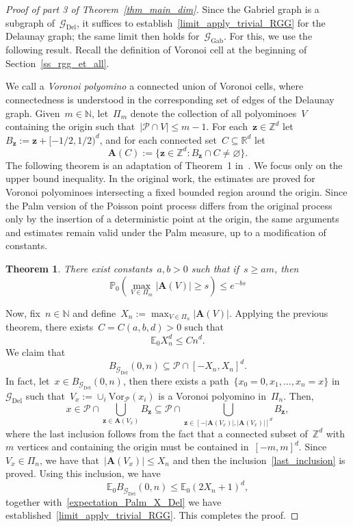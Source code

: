 \documentclass[a4paper,11pt]{article}
\newcommand{\EE}{\mathbb{E}}
\newcommand{\PP}{\mathbb{P}}
\newcommand{\RR}{\mathbb{R}}
\newcommand{\NN}{\mathbb{N}}
\newcommand{\ZZ}{\mathbb{Z}}
\newtheorem{theorem}{Theorem}
\theoremstyle{definition}
\begin{document}
\begin{proof}[Proof of part 3 of Theorem~\ref{thm_main_dim}]
Since the Gabriel graph is a subgraph of~$\mathcal G_\mathrm{Del}$, it suffices to establish~\eqref{limit_apply_trivial_RGG} for the Delaunay graph; the same limit then holds for~$\mathcal G_\mathrm{Gab}$. For this, we use the following result. Recall the definition of Voronoi cell at the beginning of Section~\ref{ss_rgg_et_all}.

We call a \emph{Voronoi polyomino} a connected union of Voronoi cells, where connectedness is understood in the corresponding set of edges of the Delaunay graph. Given~$m \in \NN$, let~$\Pi_m$ denote the collection of all polyominoes~$V$ containing the origin such that~$|\mathcal P \cap V| \leq m-1$. For each~$\mathbf z \in \ZZ^d$ let~$B_\mathbf{z} := \mathbf z + [-1/2,1/2)^d$, and for each connected set~$C \subseteq \RR^d$ let
$$ \mathbf A(C) := \{ \mathbf z \in \ZZ^d : B_\mathbf{z} \cap C \neq \varnothing \}. $$
The following theorem is an adaptation of Theorem~1 in~\cite{Pimentel13}. We focus only on the upper bound inequality. In the original work, the estimates are proved for Voronoi polyominoes intersecting a fixed bounded region around the origin. Since the Palm version of the Poisson point process differs from the original process only by the insertion of a deterministic point at the origin, the same arguments and estimates remain valid under the Palm measure, up to a modification of constants.

\begin{theorem}
There exist constants~$a,b > 0$ such that if~$s \ge a m$, then 
$$ \PP_0 \left( \max_{V \in \Pi_m} |\mathbf A(V)| \ge s \right) \leq e^{-bs} $$
\end{theorem}

Now, fix~$n \in \NN$ and define~$X_n := \max_{V \in \Pi_n} |\mathbf A(V)|$. Applying the previous theorem, there exists~$C = C(a,b,d)>0$ such that
\begin{equation}\label{expectation_Palm_X_Del}
\EE_0 X^d_n \leq C n^d.
\end{equation}
We claim that
\begin{equation}\label{last_inclusion}
B_{\mathcal G_\mathrm{Del}}(0,n) \subseteq \mathcal P \cap [-X_n,X_n]^d.
\end{equation}
In fact, let~$x \in B_{\mathcal G_\mathrm{Del}}(0,n)$, then there exists a path~$\{x_0 = 0,x_1,\dots,x_n = x\}$ in~$\mathcal G_\mathrm{Del}$ such that~$V_x := \cup_i \mathrm{Vor}_\mathcal{P}(x_i)$ is a Voronoi polyomino in~$\Pi_n$. Then, 
$$ x \in \mathcal P \cap \bigcup_{\mathbf z \in \mathbf{A}(V_x)} B_\mathbf{z} \subseteq \mathcal P \cap \bigcup_{\mathbf z \in [-|\mathbf A(V_x)|, |\mathbf A(V_x)|]^d} B_\mathbf{z}, $$
where the last inclusion follows from the fact that a connected subset of~$\ZZ^d$ with~$m$ vertices and containing the origin must be contained in~$[-m,m]^d$. Since~$V_x \in \Pi_n$, we have that~$|\mathbf A(V_x)| \leq X_n$ and then the inclusion~\eqref{last_inclusion} is proved. Using this inclusion, we have
$$ \EE_0 B_{\mathcal G_\mathrm{Del}}(0,n) \leq \EE_0 (2X_n+1)^d, $$
together with~\eqref{expectation_Palm_X_Del} we have established~\eqref{limit_apply_trivial_RGG}. This completes the proof.
\end{proof}
\end{document}
